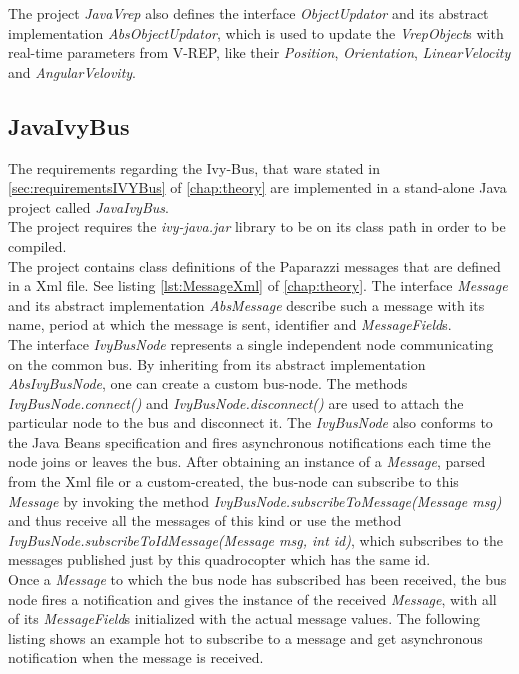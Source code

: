 The project \textit{JavaVrep} also defines the interface \textit{ObjectUpdator} and its abstract implementation \textit{AbsObjectUpdator}, which is used to update the \textit{VrepObject}s with real-time parameters from V-REP, like their \textit{Position}, \textit{Orientation}, \textit{LinearVelocity} and \textit{AngularVelovity}.


\subsection{JavaIvyBus}
\label{sec:ivyBusImplementation}

The requirements regarding the Ivy-Bus, that ware stated in \ref{sec:requirementsIVYBus} of \ref{chap:theory} are implemented in a stand-alone Java project called \textit{JavaIvyBus}. \\
The project requires the \textit{ivy-java.jar} library to be on its class path in order to be compiled.\\
The project contains class definitions of the Paparazzi messages that are defined in a Xml file. See listing \ref{lst:MessageXml} of \ref{chap:theory}. The interface \textit{Message} and its abstract implementation \textit{AbsMessage} describe such a message with its name, period at which the message is sent, identifier and \textit{MessageField}s. \\
The interface \textit{IvyBusNode} represents a single independent node communicating on the common bus. By inheriting from its abstract implementation \textit{AbsIvyBusNode}, one can create a custom bus-node. The methods \textit{IvyBusNode.connect()} and \textit{IvyBusNode.disconnect()} are used to attach the particular node to the bus and disconnect it. The \textit{IvyBusNode} also conforms to the Java Beans specification and  fires asynchronous notifications each time the node joins or leaves the bus.
After obtaining an instance of a \textit{Message}, parsed from the Xml file or a custom-created, the bus-node can subscribe to this \textit{Message} by invoking the method \textit{IvyBusNode.subscribeToMessage(Message msg)} and thus receive all the messages of this kind or use the method \textit{IvyBusNode.subscribeToIdMessage(Message msg, int id)}, which subscribes to the messages published just by this quadrocopter which has the same id. \\
Once a \textit{Message} to which the bus node has subscribed has been received, the bus node fires a notification and gives the instance of the received \textit{Message}, with all of its \textit{MessageField}s initialized with the actual message values. 
The following listing shows an example hot to subscribe to a message and get asynchronous notification when the message is received.

